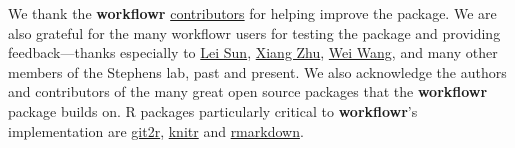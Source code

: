 \documentclass[9pt,a4paper]{extarticle}
\begin{document}
We thank the \textbf{workflowr}
\href{https://github.com/jdblischak/workflowr/graphs/contributors}{contributors}
for helping improve the package. We are also grateful for the many
workflowr users for testing the package and providing feedback---thanks
especially to \href{https://github.com/LSun}{Lei Sun},
\href{https://github.com/xiangzhu}{Xiang Zhu},
\href{https://github.com/NKweiwang}{Wei Wang}, and many other members of
the Stephens lab, past and present. We also acknowledge the authors and
contributors of the many great open source packages that the \textbf{workflowr}
package builds on. R packages particularly critical to \textbf{workflowr}'s
implementation are
\href{https://cran.r-project.org/web/packages/git2r/index.html}{git2r},
\href{https://github.com/yihui/knitr}{knitr} and
\href{http://rmarkdown.rstudio.com/}{rmarkdown}.

{\small

}
\end{document}
